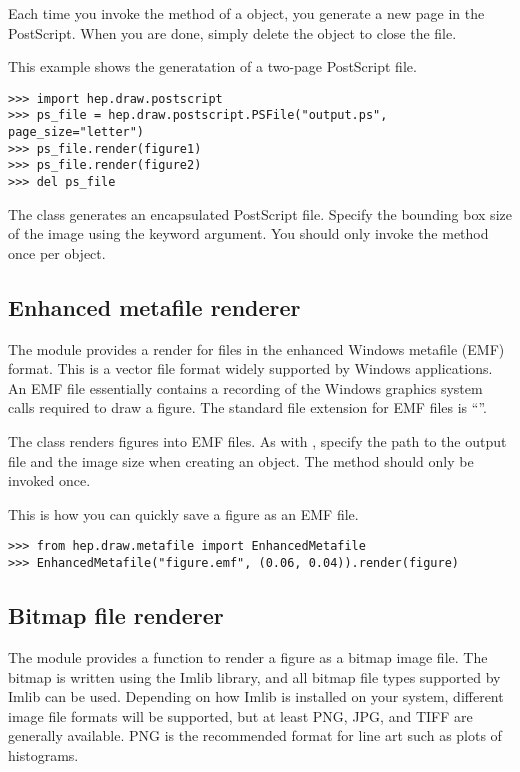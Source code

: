 Each time you invoke the  method of a 
object, you generate a new page in the PostScript.  When you are done,
simply delete the  object to close the file.

This example shows the generatation of a two-page PostScript file.
\begin{verbatim}
>>> import hep.draw.postscript
>>> ps_file = hep.draw.postscript.PSFile("output.ps", page_size="letter")
>>> ps_file.render(figure1)
>>> ps_file.render(figure2)
>>> del ps_file
\end{verbatim}

The class  generates an encapsulated PostScript file.
Specify the bounding box size of the image using the  keyword
argument.  You should only invoke the  method
once per  object.

\subsection{Enhanced metafile renderer}

The module  provides a render for files in the
enhanced Windows metafile (EMF) format.  This is a vector file format
widely supported by Windows applications.  An EMF file essentially
contains a recording of the Windows graphics system calls required to
draw a figure.  The standard file extension for EMF files is
``''.

The  class renders figures into EMF files.  As
with , specify the path to the output file and the image
size when creating an  object.  The
 method should only be invoked once.

This is how you can quickly save a figure as an EMF file.
\begin{verbatim}
>>> from hep.draw.metafile import EnhancedMetafile
>>> EnhancedMetafile("figure.emf", (0.06, 0.04)).render(figure)
\end{verbatim}

\subsection{Bitmap file renderer}

The module  provides a function
 to render a figure as a bitmap image file.  The bitmap
is written using the Imlib library, and all bitmap file types supported
by Imlib can be used.  Depending on how Imlib is installed on your
system, different image file formats will be supported, but at least
PNG, JPG, and TIFF are generally available.  PNG is the recommended
format for line art such as plots of histograms.


